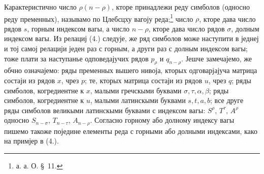﻿\documentclass[11pt]{article}
\begin{document}
Карактеристично число $\rho(n-\rho)$, кторе принадлежи реду симболов (односно реду пременных), называмо по Цлебсцху вагоју реда;\footnote{а. а. О. \S\ 11.} число $\rho$, кторе дава число рядов $s$, горным индексом вагы, а число $n-\rho$, кторе дава число рядов $\sigma$, долным индексом вагы. Из релациј (4.) следује, же ряд симболов може наступити в једнеј и тој самој релацији једен раз с горным, а други раз с долным индексом вагы; тоже плати за наступанье одповедајучих рядов $p_\rho$ и $q_{n-\rho}$. Јешче замечајемо, же обчно означајемо: ряды пременных вышего нивоја, кторых одговарјајуча матрица состаји из рядов $x$, чрез $p$; те, кторых матрица состаји из рядов $u$, чрез $q$; ряды симболов, когредиентне к $x$, малыми гречскыми буквами $\sigma,\tau,\alpha,\beta$; ряды симболов, когредиентне к $u$, малыми латинскыми буквами $s,t,a,b$; все друге ряды симболов великыми латинскыми буквами с индексом вагы: $S^\rho$, $T^\tau$, $A^\rho$ односно $S_{n-\sigma}$, $T_{n-\tau}$, $A_{n-\rho}$. Согласно горному або долному индексу вагы пишемо такоже поједине елементы реда с горными або долными индексами, како на примјер в (4.).
\end{document}
